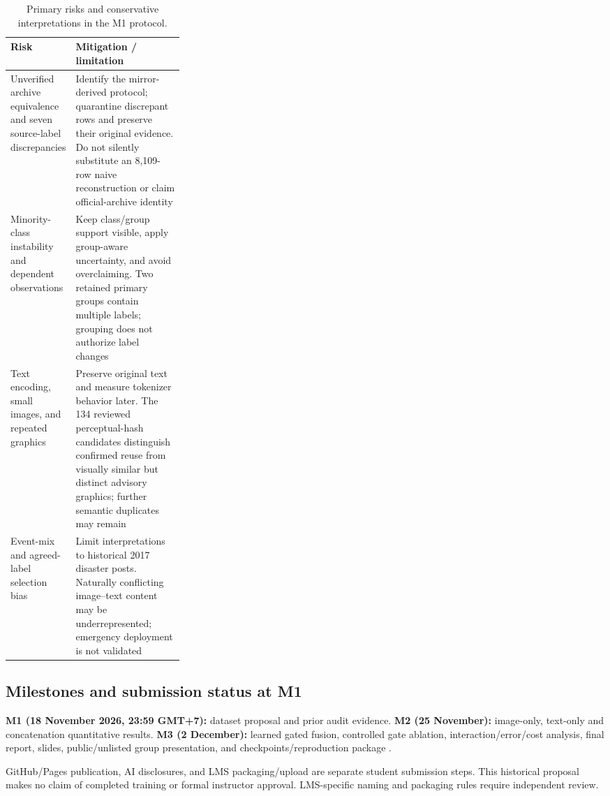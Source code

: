\documentclass[11pt,a4paper]{article}
\begin{document}
\begin{table}[htbp]
\centering\small
\caption{Primary risks and conservative interpretations in the M1 protocol.}
\label{tab:risks}
\begin{tabularx}{\linewidth}{@{}>{\raggedright\arraybackslash}p{0.29\linewidth}>{\raggedright\arraybackslash}X@{}}
\toprule
Risk & Mitigation / limitation \\
\midrule
Unverified archive equivalence and seven source-label discrepancies & Identify the mirror-derived protocol; quarantine discrepant rows and preserve their original evidence. Do not silently substitute an 8,109-row naive reconstruction or claim official-archive identity \\
Minority-class instability and dependent observations & Keep class/group support visible, apply group-aware uncertainty, and avoid overclaiming. Two retained primary groups contain multiple labels; grouping does not authorize label changes \\
Text encoding, small images, and repeated graphics & Preserve original text and measure tokenizer behavior later. The 134 reviewed perceptual-hash candidates distinguish confirmed reuse from visually similar but distinct advisory graphics; further semantic duplicates may remain \\
Event-mix and agreed-label selection bias & Limit interpretations to historical 2017 disaster posts. Naturally conflicting image--text content may be underrepresented; emergency deployment is not validated \\
\bottomrule
\end{tabularx}
\end{table}

\subsection{Milestones and submission status at M1}
\textbf{M1 (18 November 2026, 23:59 GMT+7):} dataset proposal and prior audit evidence. \textbf{M2 (25 November):} image-only, text-only and concatenation quantitative results. \textbf{M3 (2 December):} learned gated fusion, controlled gate ablation, interaction/error/cost analysis, final report, slides, public/unlisted group presentation, and checkpoints/reproduction package \cite{handbook2026}.

GitHub/Pages publication, AI disclosures, and LMS packaging/upload are separate student submission steps. This historical proposal makes no claim of completed training or formal instructor approval. LMS-specific naming and packaging rules require independent review.
\end{document}
